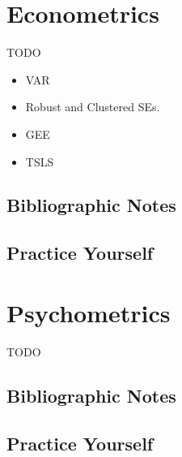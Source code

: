 \documentclass[]{book}
\providecommand{\tightlist}{%
  \setlength{\itemsep}{0pt}\setlength{\parskip}{0pt}}
\theoremstyle{definition}
\theoremstyle{definition}
\theoremstyle{definition}
\theoremstyle{remark}
\begin{document}
\chapter{Econometrics}\label{econometrics}

TODO

\begin{itemize}
\tightlist
\item
  VAR
\item
  Robust and Clustered SEs.
\item
  GEE
\item
  TSLS
\end{itemize}

\section{Bibliographic Notes}\label{bibliographic-notes-18}

\section{Practice Yourself}\label{practice-yourself-19}

\chapter{Psychometrics}\label{psychometrics}

TODO

\section{Bibliographic Notes}\label{bibliographic-notes-19}

\section{Practice Yourself}\label{practice-yourself-20}


\end{document}
